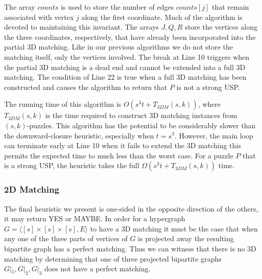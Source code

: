 \documentclass[11pt]{article}
\begin{document}
The array $counts$ is used to store the number of edges $counts[j]$
that remain associated with vertex $j$ along the first coordinate.
Much of the algorithm is devoted to maintaining this invariant.  The
arrays $J,Q,R$ store the vertices along the three coordinates,
respectively, that have already been incorporated into the partial 3D
matching.  Like in our previous algorithms we do not store the
matching itself, only the vertices involved.  The break at Line 10
triggers when the partial 3D matching is a dead end and cannot be
extended into a full 3D matching.  The condition of Line 22 is true
when a full 3D matching has been constructed and causes the algorithm
to return that $P$ is not a strong USP.

The running time of this algorithm is $O(s^3 t + T_{3DM}(s,k))$, where
$T_{3DM}(s,k)$ is the time required to construct 3D matching
instances from $(s,k)$-puzzles.  This algorithm has the potential to
be considerably slower than the downward-closure heuristic, especially
when $t = s^3$.  However, the main loop can terminate early at Line 10
when it fails to extend the 3D matching this permits the expected time
to much less than the worst case.  For a puzzle $P$ that is a strong
USP, the heuristic takes the full $\Omega(s^3 t + T_{3DM}(s,k))$ time.  


\begin{comment}

 
\subsubsection{Graph Automorphism}

A strong uniquely-solvable puzzle must also be a uniquely-solvable
puzzle.  Given a puzzle $P$ we can construct a graph $G_P$ such that
$G_P$ is rigid iff $P$ is a uniquely-solvable puzzle.

XXX - I don't think this idea worked out.  The code correctly
implemented the approach, but the approach was flawed.  Probably
remove this section or add to future work.

\end{comment}

\subsubsection{2D Matching}

The final heuristic we present is one-sided in the opposite direction
of the others, it may return YES or MAYBE.  In order for a hypergraph
$G = \langle [s] \times [s] \times [s], E\rangle$ to have a 3D
matching it must be the case that when any one of the three parts of
vertices of $G$ is projected away the resulting bipartite graph has a
perfect matching.  Thus we can witness that there is no 3D matching by
determining that one of three projected bipartite graphs $G|_1, G|_2,
G|_3$ does not have a perfect matching. 
\end{document}
